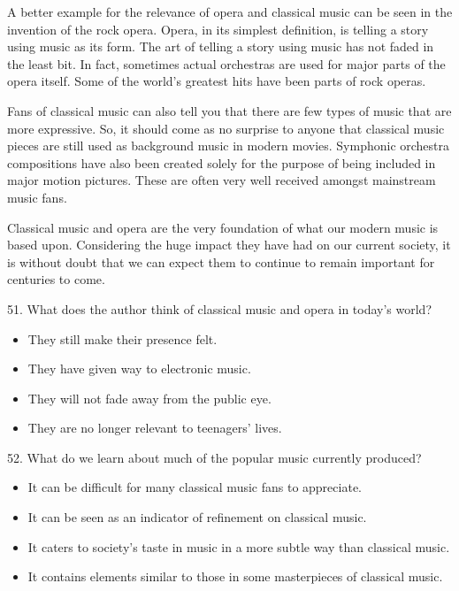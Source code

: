 \documentclass[UTF8,11pt]{ctexart}
\begin{document}
A better example for the relevance of opera and classical music can be seen in the invention of the rock opera. Opera, in its simplest definition, is telling a story using music as its form. The art of telling a story using music has not faded in the least bit. In fact, sometimes actual orchestras are used for major parts of the opera itself. Some of the world’s greatest hits have been parts of rock operas.


Fans of classical music can also tell you that there are few types of music that are more expressive. So, it should come as no surprise to anyone that classical music pieces are still used as background music in modern movies. Symphonic orchestra compositions have also been created solely for the purpose of being included in major motion pictures. These are often very well received amongst mainstream music fans.


Classical music and opera are the very foundation of what our modern music is based upon. Considering the huge impact they have had on our current society, it is without doubt that we can expect them to continue to remain important for centuries to come.


51. What does the author think of classical music and opera in today’s world?


\begin{itemize}[leftmargin=2em,itemsep=.2em,topsep=.4em]\item[A.] They still make their presence felt.
\item[B.] They have given way to electronic music.
\item[C.] They will not fade away from the public eye.
\item[D.] They are no longer relevant to teenagers’ lives.
\end{itemize}

52. What do we learn about much of the popular music currently produced?


\begin{itemize}[leftmargin=2em,itemsep=.2em,topsep=.4em]\item[A.] It can be difficult for many classical music fans to appreciate.
\item[B.] It can be seen as an indicator of refinement on classical music.
\item[C.] It caters to society’s taste in music in a more subtle way than classical music.
\item[D.] It contains elements similar to those in some masterpieces of classical music.
\end{itemize}
\end{document}

